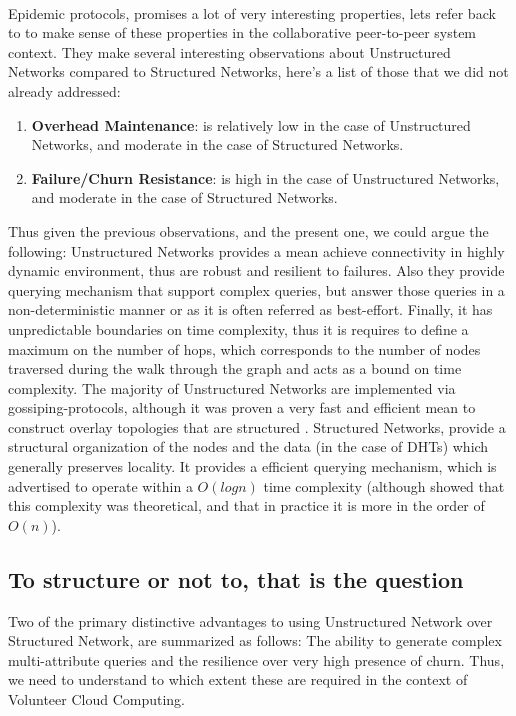 \documentclass[11pt]{amsart}
\begin{document}
        \\
        Epidemic protocols, promises a lot of very interesting properties, lets refer back
        to \cite{p2p_collab} to make sense of these properties in the collaborative
        peer-to-peer system context. They make several interesting observations about
        Unstructured Networks compared to Structured Networks, here's a list of those that
        we did not already addressed:
        \begin{enumerate}
          \item \textbf{Overhead Maintenance}: is relatively low in the case of
            Unstructured Networks, and moderate in the case of Structured Networks.
          \item \textbf{Failure/Churn Resistance}: is high in the case of Unstructured
            Networks, and moderate in the case of Structured Networks.
        \end{enumerate}
        Thus given the previous observations, and the present one, we could argue the
        following: Unstructured Networks provides a mean achieve connectivity in highly
        dynamic environment, thus are robust and resilient to failures. Also they provide
        querying mechanism that support complex queries, but answer those queries in a
        non-deterministic manner or as it is often referred as best-effort. Finally, it
        has unpredictable boundaries on time complexity, thus it is requires to define a
        maximum on the number of hops, which corresponds to the number of nodes traversed
        during the walk through the graph and acts as a bound on time complexity. The
        majority of Unstructured Networks are implemented via gossiping-protocols,
        although it was proven a very fast and efficient mean to construct overlay
        topologies that are structured \cite{jelasity2009t}. Structured Networks, provide
        a structural organization of the nodes and the data (in the case of DHTs) which
        generally preserves locality. It provides a efficient querying mechanism, which is
        advertised to operate within a $O(log n)$ time complexity (although
        \cite{bandara2012evaluation} showed that this complexity was theoretical, and that
        in practice it is more in the order of $O(n)$).
        
        \subsection{To structure or not to, that is the question}
        Two of the primary distinctive advantages to using Unstructured Network over
        Structured Network, are summarized as follows: The ability to generate complex
        multi-attribute queries and the resilience over very high presence of churn. Thus,
        we need to understand to which extent these are required in the context of
        Volunteer Cloud Computing. 
        
\end{document}
